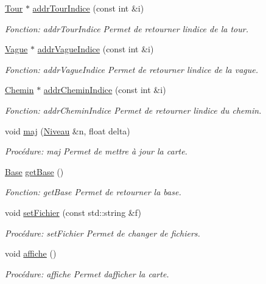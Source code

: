 \begin{DoxyCompactItemize}
\hyperlink{classTour}{Tour} $\ast$ \hyperlink{classCarte_a573a9aa2b9917152357b710fe0be6ecc}{addr\+Tour\+Indice} (const int \&i)
\begin{DoxyCompactList}\small\item\em Fonction\+: addr\+Tour\+Indice Permet de retourner l\textquotesingle{}indice de la tour. \end{DoxyCompactList}\item 
\hyperlink{classVague}{Vague} $\ast$ \hyperlink{classCarte_a21708cf932e4d0e74ed0222f7950582a}{addr\+Vague\+Indice} (const int \&i)
\begin{DoxyCompactList}\small\item\em Fonction\+: addr\+Vague\+Indice Permet de retourner l\textquotesingle{}indice de la vague. \end{DoxyCompactList}\item 
\hyperlink{classChemin}{Chemin} $\ast$ \hyperlink{classCarte_a16a507cb5eb10f57f0d34052db75689c}{addr\+Chemin\+Indice} (const int \&i)
\begin{DoxyCompactList}\small\item\em Fonction\+: addr\+Chemin\+Indice Permet de retourner l\textquotesingle{}indice du chemin. \end{DoxyCompactList}\item 
void \hyperlink{classCarte_a6d721dfc81b3a45f038c73d20e80d545}{maj} (\hyperlink{classNiveau}{Niveau} \&n, float delta)
\begin{DoxyCompactList}\small\item\em Procédure\+: maj Permet de mettre à jour la carte. \end{DoxyCompactList}\item 
\hyperlink{classBase}{Base} \hyperlink{classCarte_af76239ad9a307cf94ba0916ea477a331}{get\+Base} ()
\begin{DoxyCompactList}\small\item\em Fonction\+: get\+Base Permet de retourner la base. \end{DoxyCompactList}\item 
void \hyperlink{classCarte_a66c41e01a4a8730630bd77b6dd1b670e}{set\+Fichier} (const std\+::string \&f)
\begin{DoxyCompactList}\small\item\em Procédure\+: set\+Fichier Permet de changer de fichiers. \end{DoxyCompactList}\item 
void \hyperlink{classCarte_aef8696f9e6017496583bf32fb7cceb80}{affiche} ()
\begin{DoxyCompactList}\small\item\em Procédure\+: affiche Permet d\textquotesingle{}afficher la carte. \end{DoxyCompactList}\end{DoxyCompactItemize}


